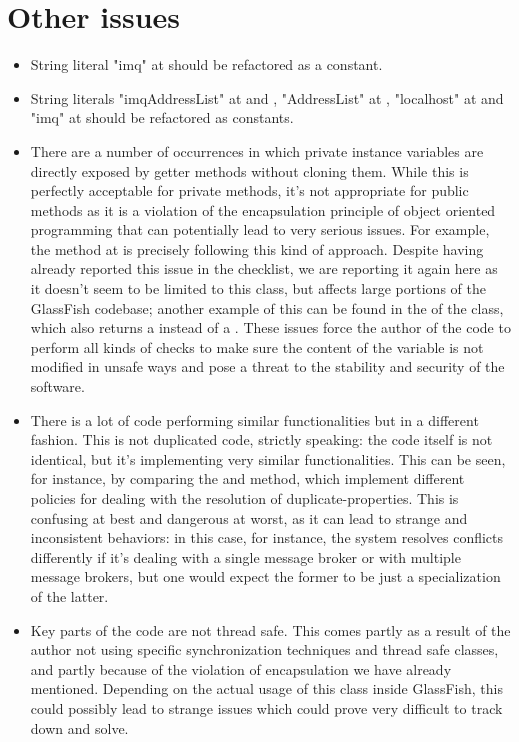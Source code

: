 \section{Other issues}
\begin{itemize}
	\item String literal "imq" at  should be refactored as a constant.	
	\item String literals "imqAddressList" at  and , "AddressList" at , "localhost" at  and "imq" at  should be refactored as constants. 
	\item There are a number of occurrences in which private instance variables are directly exposed by getter methods without cloning them. While this is perfectly acceptable for private methods, it's not appropriate for public methods as it is a violation of the encapsulation principle of object oriented programming that can potentially lead to very serious issues. For example, the  method at  is precisely following this kind of approach. Despite having already reported this issue in the checklist, we are reporting it again here as it doesn't seem to be limited to this class, but affects large portions of the GlassFish codebase; another example of this can be found in the  of the class, which also returns a  instead of a . These issues force the author of the code to perform all kinds of checks to make sure the content of the variable is not modified in unsafe ways and pose a threat to the stability and security of the software.
	\item There is a lot of code performing similar functionalities but in a different fashion. This is not duplicated code, strictly speaking: the code itself is not identical, but it's implementing very similar functionalities. This can be seen, for instance, by comparing the  and  method, which implement different policies for dealing with the resolution of duplicate-properties. This is confusing at best and dangerous at worst, as it can lead to strange and inconsistent behaviors: in this case, for instance, the system resolves conflicts differently if it's dealing with a single message broker or with multiple message brokers, but one would expect the former to be just a specialization of the latter. 
	 \item Key parts of the code are not thread safe. This comes partly as a result of the author not using specific synchronization techniques and thread safe classes, and partly because of the violation of encapsulation we have already mentioned. Depending on the actual usage of this class inside GlassFish, this could possibly lead to strange issues which could prove very difficult to track down and solve. 
\end{itemize}
	 
